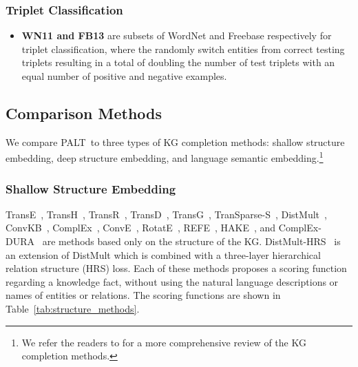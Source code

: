 \documentclass[11pt]{article}
\newcommand{\method}{\textsc{PALT}}
\begin{document}
\subsubsection{Triplet Classification}
\begin{itemize}[leftmargin=*]
\item {\bf WN11 and FB13} are subsets of WordNet and Freebase respectively for triplet classification, where the \citet{KB_NL_1} randomly switch entities from correct testing triplets resulting in a total of doubling the number of test triplets with an equal number of positive and negative examples.
\end{itemize}

\subsection{Comparison Methods}
\label{app:model}
We compare \method\ to three types of KG completion methods: shallow structure embedding, deep structure embedding, and language semantic embedding.\footnote{We refer the readers to \cite{ji2021survey} for a more comprehensive review of the KG completion methods.}

\subsubsection{Shallow Structure Embedding}
TransE~\cite{TransE}, TransH~\cite{TransH}, TransR~\cite{TransR}, TransD~\cite{ji_knowledge_2015}, TransG~\cite{xiao_transg_2016}, TranSparse-S~\cite{ji_knowledge_2016}, DistMult~\cite{DistMult}, ConvKB~\cite{ConvKB}, ComplEx~\cite{trouillon_complex_2016}, ConvE~\cite{ConvE}, RotatE~\cite{RotateE}, REFE~\cite{chami-etal-2020-low}, HAKE~\cite{zhang_learning_2019}, and ComplEx-DURA~\cite{NEURIPS2020_f6185f0e} are methods based only on the structure of the KG. DistMult-HRS~\cite{zhang_knowledge_2018} is an extension of DistMult which is combined with a three-layer hierarchical relation structure (HRS) loss. Each of these methods proposes a scoring function regarding a knowledge fact, without using the natural language descriptions or names of entities or relations. The scoring functions are shown in Table~\ref{tab:structure_methods}.
\end{document}

